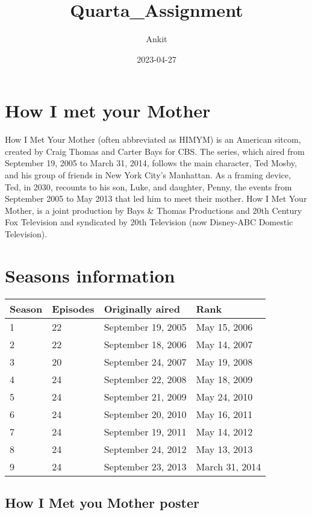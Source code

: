 \documentclass[
]{article}
\title{Quarta\_Assignment}
\author{Ankit}
\date{2023-04-27}
\begin{document}
\maketitle

\hypertarget{how-i-met-your-mother}{%
\section{How I met your Mother}\label{how-i-met-your-mother}}

How I Met Your Mother (often abbreviated as HIMYM) is an American
sitcom, created by Craig Thomas and Carter Bays for CBS. The series,
which aired from September 19, 2005 to March 31, 2014, follows the main
character, Ted Mosby, and his group of friends in New York City's
Manhattan. As a framing device, Ted, in 2030, recounts to his son, Luke,
and daughter, Penny, the events from September 2005 to May 2013 that led
him to meet their mother. How I Met Your Mother, is a joint production
by Bays \& Thomas Productions and 20th Century Fox Television and
syndicated by 20th Television (now Disney-ABC Domestic Television).

\hypertarget{seasons-information}{%
\section{Seasons information}\label{seasons-information}}

\begin{longtable}[]{@{}llll@{}}
\toprule()
Season & Episodes & Originally aired & Rank \\
\midrule()
\endhead
1 & 22 & September 19, 2005 & May 15, 2006 \\
2 & 22 & September 18, 2006 & May 14, 2007 \\
3 & 20 & September 24, 2007 & May 19, 2008 \\
4 & 24 & September 22, 2008 & May 18, 2009 \\
5 & 24 & September 21, 2009 & May 24, 2010 \\
6 & 24 & September 20, 2010 & May 16, 2011 \\
7 & 24 & September 19, 2011 & May 14, 2012 \\
8 & 24 & September 24, 2012 & May 13, 2013 \\
9 & 24 & September 23, 2013 & March 31, 2014 \\
\bottomrule()
\end{longtable}

\hypertarget{how-i-met-you-mother-poster}{%
\subsection{How I Met you Mother
poster}\label{how-i-met-you-mother-poster}}
\end{document}

